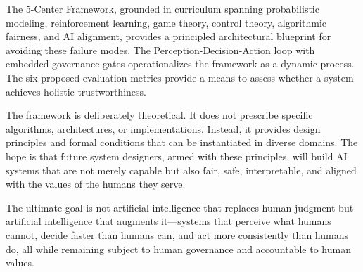 \documentclass[11pt,a4paper]{article}
\begin{document}
The 5-Center Framework, grounded in curriculum spanning probabilistic modeling, reinforcement learning, game theory, control theory, algorithmic fairness, and AI alignment, provides a principled architectural blueprint for avoiding these failure modes. The Perception-Decision-Action loop with embedded governance gates operationalizes the framework as a dynamic process. The six proposed evaluation metrics provide a means to assess whether a system achieves holistic trustworthiness.

The framework is deliberately theoretical. It does not prescribe specific algorithms, architectures, or implementations. Instead, it provides design principles and formal conditions that can be instantiated in diverse domains. The hope is that future system designers, armed with these principles, will build AI systems that are not merely capable but also fair, safe, interpretable, and aligned with the values of the humans they serve.

The ultimate goal is not artificial intelligence that replaces human judgment but artificial intelligence that augments it---systems that perceive what humans cannot, decide faster than humans can, and act more consistently than humans do, all while remaining subject to human governance and accountable to human values.
\end{document}
